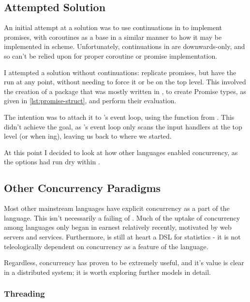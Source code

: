 \subsection{Attempted Solution}

An initial attempt at a solution was to use continuations in \R{} to implement promises, with coroutines as a base in a similar manner to how it may be implemented in scheme.
Unfortunately, continuations in \R{} are downwards-only, and so can't be relied upon for proper coroutine or promise implementation.

I attempted a solution without continuations: replicate promises, but have the  run at any point, without needing to force it or be on the top level.
This involved the creation of a package that was mostly written in , to create Promise types, as given in \cref{lst:promise-struct}, and perform their evaluation.


The intention was to attach it to \R{}'s event loop, using the  function from .
This didn't achieve the goal, as \R{}'s event loop only scans the input handlers at the top level (or when ing), leaving us back to where we started.

At this point I decided to look at how other languages enabled concurrency, as the options had run dry within \R{}.

\subsection{Other Concurrency Paradigms}

Most other mainstream languages have explicit concurrency as a part of the language.
This isn't necessarily a failing of \R{}.
Much of the uptake of concurrency among languages only began in earnest relatively recently, motivated by web servers and services.
Furthermore, \R{} is still at heart a DSL for statistics - it is not teleologically dependent on concurrency as a feature of the language.

Regardless, concurrency has proven to be extremely useful, and it's value is clear in a distributed system;
it is worth exploring further models in detail.

\subsubsection{Threading}

